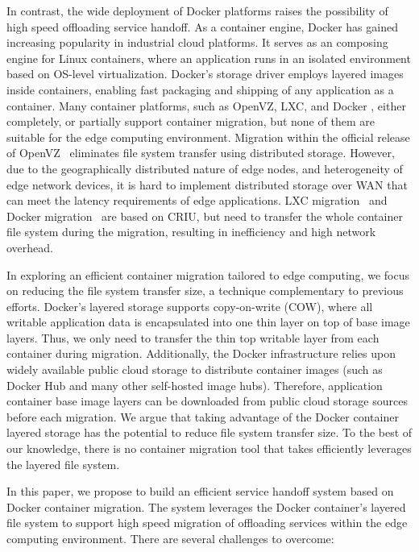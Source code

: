 In contrast, the wide deployment of Docker platforms raises the possibility of high speed offloading service handoff. As a container engine, Docker has gained increasing popularity in industrial cloud platforms. It serves as an composing engine for Linux containers, where an application runs in an isolated environment based on OS-level virtualization.
Docker's storage driver employs layered images inside containers, enabling fast packaging and shipping of any application as a container. 
Many container platforms, such as OpenVZ\cite{openvz}, LXC\cite{qiu2016evaluating}, and Docker \cite{phaul,boucherPhaul}, either completely, or partially support container migration, but none of them are suitable for the edge computing environment. Migration within the official release of OpenVZ~\cite{phaul} eliminates file system transfer using distributed storage. However, due to the geographically distributed nature of edge nodes, and heterogeneity of edge network devices, it is hard to implement distributed storage over WAN that can meet the latency requirements of edge applications. 
LXC migration~\cite{qiu2016evaluating} and Docker migration~\cite{phaul, boucherPhaul} are based on CRIU\cite{criu}, but need to transfer the whole container file system during the migration, resulting in inefficiency and high network overhead.

In exploring an efficient container migration tailored to edge computing, we focus on reducing the file system transfer size, a technique complementary to previous efforts.
%
Docker's layered storage supports copy-on-write (COW), where all writable application data is encapsulated into one thin layer on top of base image layers.
Thus, we only need to transfer the thin top writable layer from each container during migration. Additionally, the Docker infrastructure relies upon widely available public cloud storage to distribute container images (such as Docker Hub\cite{dockerhub} and many other self-hosted image hubs). 
Therefore, application container base image layers can be downloaded from public cloud storage sources before each migration. We argue that taking advantage of the Docker container layered storage has the potential to reduce file system transfer size. To the best of our knowledge, there is no container migration tool that takes efficiently leverages the layered file system. 




In this paper, we propose to build an efficient service handoff system based on Docker container migration. The system leverages the Docker container's layered file system to support high speed migration of offloading services within the edge computing environment. 
There are several challenges to overcome:

